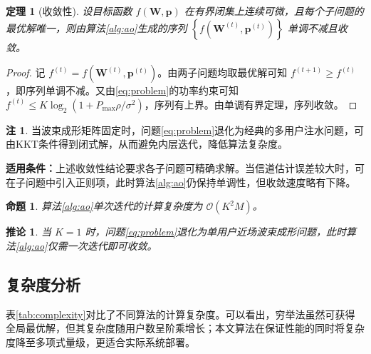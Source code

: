 \documentclass[UTF8, a4paper, zihao=-4, fontset=windows]{ctexart}
\theoremstyle{plain}
\newtheorem{theorem}{定理}
\newtheorem{corollary}{推论}
\theoremstyle{definition}
\newtheorem{remark}{注}
\theoremstyle{plain}
\newtheorem{proposition}{命题}
\begin{document}
\begin{theorem}[收敛性]\label{thm:convergence}
设目标函数 $f(\mathbf{W},\mathbf{p})$ 在有界闭集上连续可微，且每个子问题的最优解唯一，则由算法\ref{alg:ao}生成的序列 $\left\{f\left(\mathbf{W}^{(t)},\mathbf{p}^{(t)}\right)\right\}$ 单调不减且收敛。
\end{theorem}

\begin{proof}
记 $f^{(t)}=f\left(\mathbf{W}^{(t)},\mathbf{p}^{(t)}\right)$。由两子问题均取最优解可知 $f^{(t+1)}\ge f^{(t)}$，即序列单调不减。又由\eqref{eq:problem}的功率约束可知 $f^{(t)}\le K\log_2\left(1+P_{\max}\rho/\sigma^2\right)$，序列有上界。由单调有界定理，序列收敛。
\end{proof}

\begin{remark}\label{rem:water}
当波束成形矩阵固定时，问题\eqref{eq:problem}退化为经典的多用户注水问题，可由KKT条件得到闭式解，从而避免内层迭代，降低算法复杂度。
\end{remark}

\begin{mdframed}[linewidth=0.6pt, linecolor=black!45, backgroundcolor=black!4,
                 roundcorner=3pt, leftmargin=1em, rightmargin=1em,
                 innertopmargin=0.6em, innerbottommargin=0.6em]
\textbf{适用条件：}上述收敛性结论要求各子问题可精确求解。当信道估计误差较大时，可在子问题中引入正则项，此时算法\ref{alg:ao}仍保持单调性，但收敛速度略有下降。
\end{mdframed}

\begin{proposition}\label{prop:complexity}
算法\ref{alg:ao}单次迭代的计算复杂度为 $\mathcal{O}\left(K^2M\right)$。
\end{proposition}

\begin{corollary}\label{cor:special}
当 $K=1$ 时，问题\eqref{eq:problem}退化为单用户近场波束成形问题，此时算法\ref{alg:ao}仅需一次迭代即可收敛。
\end{corollary}

\subsection{复杂度分析}\label{sec:complexity}

表\ref{tab:complexity}对比了不同算法的计算复杂度。可以看出，穷举法虽然可获得全局最优解，但其复杂度随用户数呈阶乘增长；本文算法在保证性能的同时将复杂度降至多项式量级，更适合实际系统部署。
\end{document}
